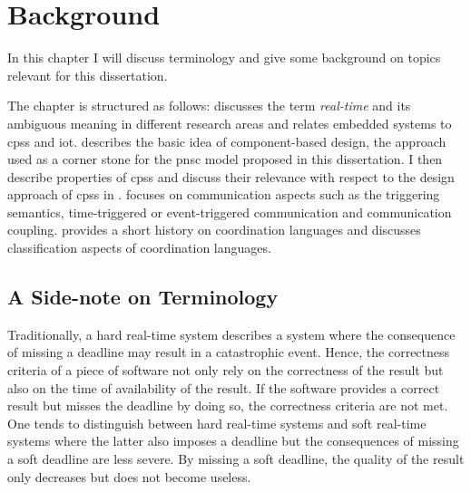 %
\chapter{Background}
\label{chap_background}

In this chapter I will discuss terminology and give some background on topics relevant for this dissertation.

The chapter is structured as follows:
\Sect{\ref{sect_background_term}} discusses the term \emph{real-time} and its ambiguous meaning in different research areas and relates embedded systems to \glspl{cps} and \gls{iot}.
\Sect{\ref{sect_background_comp}} describes the basic idea of component-based design, the approach used as a corner stone for the \gls{pnsc} model proposed in this dissertation.
I then describe properties of \glspl{cps} and discuss their relevance with respect to the design approach of \glspl{cps} in \Sect{\ref{sect_background_cps}}.
\Sect{\ref{sect_background_com}} focuses on communication aspects such as the triggering semantics, \ie time-triggered or event-triggered communication and communication coupling.
\Sect{\ref{sect_background_coord}} provides a short history on coordination languages and discusses classification aspects of coordination languages.

\section{A Side-note on Terminology}
\label{sect_background_term}
Traditionally, a hard real-time system describes a system where the consequence of missing a deadline may result in a catastrophic event.
Hence, the correctness criteria of a piece of software not only rely on the correctness of the result but also on the time of availability of the result.
If the software provides a correct result but misses the deadline by doing so, the correctness criteria are not met.
One tends to distinguish between hard real-time systems and soft real-time systems where the latter also imposes a deadline but the consequences of missing a soft deadline are less severe.
By missing a soft deadline, the quality of the result only decreases but does not become useless.

